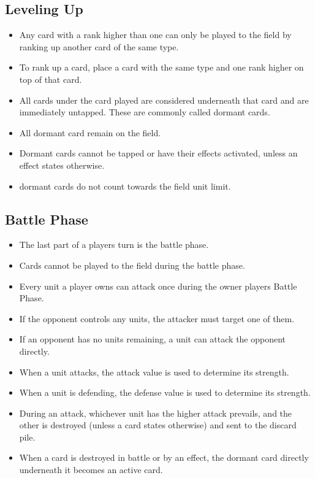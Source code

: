 \subsection{Leveling Up}
\begin{itemize}
    \item Any card with a rank higher than one can only be played to the field by ranking up another card of the same type.
    \item To rank up a card, place a card with the same type and one rank higher on top of that card.
    \item All cards under the card played are considered underneath that card and are immediately untapped. These are commonly called dormant cards.
    \item All dormant card remain on the field.
    \item Dormant cards cannot be tapped or have their effects activated, unless an effect states otherwise.
    \item dormant cards do not count towards the field unit limit.
\end{itemize}








\subsection{Battle Phase}
\begin{itemize}
    \item The last part of a players turn is the battle phase.
    \item Cards cannot be played to the field during the battle phase.
    \item Every unit a player owns can attack once during the owner players Battle Phase.
    \item If the opponent controls any units, the attacker must target one of them.
    \item If an opponent has no units remaining, a unit can attack the opponent directly.
    \item When a unit attacks, the attack value is used to determine its strength.
    \item When a unit is defending, the defense value is used to determine its strength.
    \item During an attack, whichever unit has the higher attack prevails, and the other is destroyed (unless a card states otherwise) and sent to the discard pile.
    \item When a card is destroyed in battle or by an effect, the dormant card directly underneath it becomes an active card.
\end{itemize}








